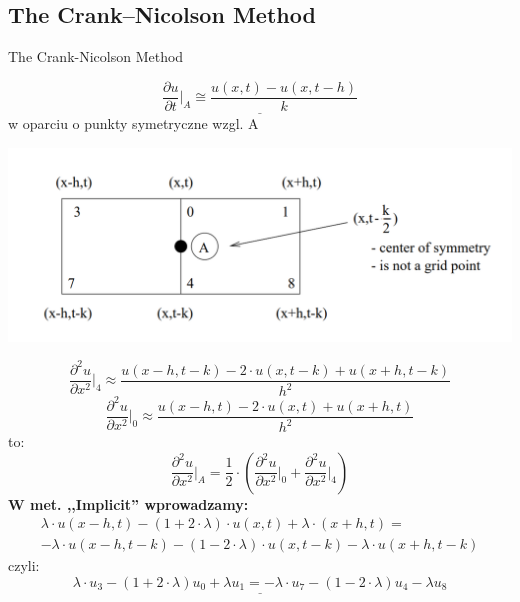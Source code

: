 
\subsection{The Crank--Nicolson Method}
\begin{frame}{The Crank-Nicolson Method}

\begin{block}{}
 \end{block}
 
\begin{equation}\underline{\frac{\partial u}{\partial t} \Big \vert _{A}\cong \frac{u(x,t) - u(x,t - h)}{k}}\end{equation} w oparciu o punkty symetryczne wzgl. A
 
 \centerline{\includegraphics[width = 1 \linewidth]{img/23/crank}}
\end{frame}

\begin{frame}
\begin{equation} \frac{\partial ^2 u}{\partial x^2} \Big \vert _{4}\approx \frac{u(x - h,t - k) - 2 \cdot u(x,t - k) + u(x + h, t - k)}{h^2}\end{equation}
\begin{equation} \frac{\partial ^2 u}{\partial x^2} \Big \vert _{0}\approx \frac{u(x - h,t) - 2 \cdot u(x,t) + u(x + h, t)}{h^2} \end{equation}
to:
\begin{equation} \frac{\partial ^2 u}{\partial x^2} \big \vert _{A} = \frac{1}{2} \cdot \left ( \frac{\partial ^2 u}{\partial x^2} \Big \vert _{0} + \frac{\partial ^2 u}{\partial x^2} \Big \vert _{4} \right )\end{equation}
\textbf{W met. ,,Implicit'' wprowadzamy:}
\begin{multline} \lambda \cdot u(x-h,t) - (1+2 \cdot \lambda)\cdot u(x,t) + \lambda \cdot (x+h,t) = \\
 -\lambda \cdot u(x-h,t-k) - (1-2 \cdot \lambda) \cdot u(x,t-k) - \lambda \cdot u(x+h,t-k)\end{multline}
czyli:
$$ \underline{\lambda \cdot u_3 - (1+2 \cdot \lambda) u_0 + \lambda u_1 = -\lambda \cdot u_7 - (1-2 \cdot \lambda) u_4 - \lambda u_8}$$
\end{frame}